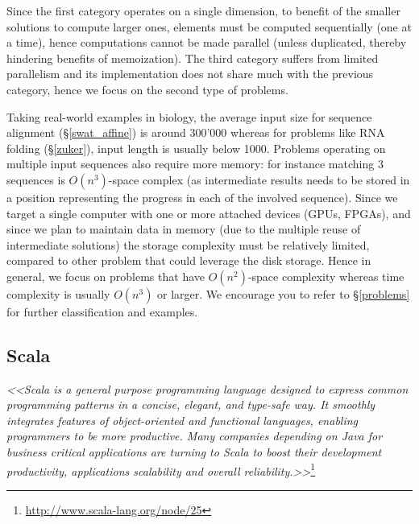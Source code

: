 Since the first category operates on a single dimension, to benefit of the smaller solutions to compute larger ones, elements must be computed sequentially (one at a time), hence computations cannot be made parallel (unless duplicated, thereby hindering benefits of memoization). The third category suffers from limited parallelism \cite{philogeny} and its implementation does not share much with the previous category, hence we focus on the second type of problems.

Taking real-world examples in biology, the average input size for sequence alignment (\S\ref{swat_affine}) is around 300'000 whereas for problems like RNA folding (\S\ref{zuker}), input length is usually below 1000. Problems operating on multiple input sequences also require more memory: for instance matching 3 sequences is $O(n^3)$-space complex (as intermediate results needs to be stored in a position representing the progress in each of the involved sequence). Since we target a single computer with one or more attached devices (GPUs, FPGAs), and since we plan to maintain data in memory (due to the multiple reuse of intermediate solutions) the storage complexity must be relatively limited, compared to other problem that could leverage the disk storage. Hence in general, we focus on problems that have $O(n^2)$-space complexity whereas time complexity is usually $O(n^3)$ or larger. We encourage you to refer to \S\ref{problems} for further classification and examples.

\newpage
\subsection{Scala} \label{bg_scala}
\textit{<<Scala is a general purpose programming language designed to express common programming patterns in a concise, elegant, and type-safe way. It smoothly integrates features of object-oriented and functional languages, enabling programmers to be more productive. Many companies depending on Java for business critical applications are turning to Scala to boost their development productivity, applications scalability and overall reliability.>>}\footnote{\url{http://www.scala-lang.org/node/25}}

